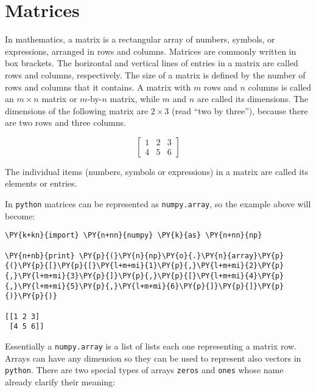 \chapter{Matrices}\label{app:matrices}

In mathematics, a matrix is a rectangular array of
numbers, symbols, or expressions, arranged in rows and columns. Matrices
are commonly written in box brackets. The horizontal and vertical lines
of entries in a matrix are called rows and columns, respectively. The
size of a matrix is defined by the number of rows and columns that it
contains. A matrix with \(m\) rows and \(n\) columns is called an
\(m\times n\) matrix or \(m\)-by-\(n\) matrix, while \(m\) and \(n\) are
called its dimensions. The dimensions of the following matrix are
\(2\times 3\) (read ``two by three''), because there are two rows and
three columns.

\[\begin{bmatrix}
1 & 2 & 3\\
4 & 5 & 6
\end{bmatrix}\]

The individual items (numbers, symbols or expressions) in a matrix are
called its elements or entries.

In \texttt{python} matrices can be represented as \texttt{numpy.array},
so the example above will become:

\begin{tcolorbox}[breakable, size=fbox, boxrule=1pt, pad at break*=1mm,colback=cellbackground, colframe=cellborder]
\begin{Verbatim}[commandchars=\\\{\}]
\PY{k+kn}{import} \PY{n+nn}{numpy} \PY{k}{as} \PY{n+nn}{np}

\PY{n+nb}{print} \PY{p}{(}\PY{n}{np}\PY{o}{.}\PY{n}{array}\PY{p}{(}\PY{p}{[}\PY{p}{[}\PY{l+m+mi}{1}\PY{p}{,}\PY{l+m+mi}{2}\PY{p}{,}\PY{l+m+mi}{3}\PY{p}{]}\PY{p}{,}\PY{p}{[}\PY{l+m+mi}{4}\PY{p}{,}\PY{l+m+mi}{5}\PY{p}{,}\PY{l+m+mi}{6}\PY{p}{]}\PY{p}{]}\PY{p}{)}\PY{p}{)}

[[1 2 3]
 [4 5 6]]
\end{Verbatim}
\end{tcolorbox}

    Essentially a \texttt{numpy.array} is a list of lists each one
representing a matrix row. Arrays can have any dimension so they can be
used to represent also vectors in \texttt{python}. There are two special
types of arrays \texttt{zeros} and \texttt{ones} whose name already
clarify their meaning:

